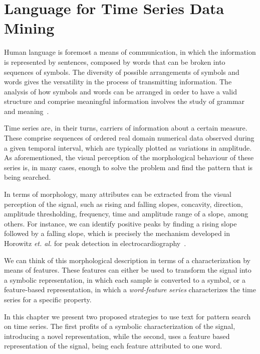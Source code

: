 
%

\chapter{Language for Time Series Data Mining}
\label{cha:text_}

Human language is foremost a means of communication, in which the information is represented by sentences, composed by words that can be broken into sequences of symbols. The diversity of possible arrangements of symbols and words gives the versatility in the process of transmitting information. The analysis of how symbols and words can be arranged in order to have a valid structure and comprise meaningful information involves the study of grammar and meaning~\citep{davidCrystal}.
\par
Time series are, in their turns, carriers of information about a certain measure. These comprise sequences of ordered real domain numerical data observed during a given temporal interval, which are typically plotted as variations in amplitude. As aforementioned, the visual perception of the morphological behaviour of these series is, in many cases, enough to solve the problem and find the pattern that is being searched.
\par
In terms of morphology, many attributes can be extracted from the visual perception of the signal, such as rising and falling slopes, concavity, direction, amplitude thresholding, frequency, time and amplitude range of a slope, among others. For instance, we can identify positive peaks by finding a rising slope followed by a falling slope, which is precisely the mechanism developed in Horowitz \textit{et. al.} for peak detection in electrocardiography~\citep{Horowitz}.
\par
We can think of this morphological description in terms of a characterization by means of features. These features can either be used to transform the signal into a symbolic representation, in which each sample is converted to a symbol, or a feature-based representation, in which a \textit{word-feature series} characterizes the time series for a specific property. 
\par
In this chapter we present two proposed strategies to use text for pattern search on time series. The first profits of a symbolic characterization of the signal, introducing a novel representation, while the second, uses a feature based representation of the signal, being each feature attributed to one word. 


